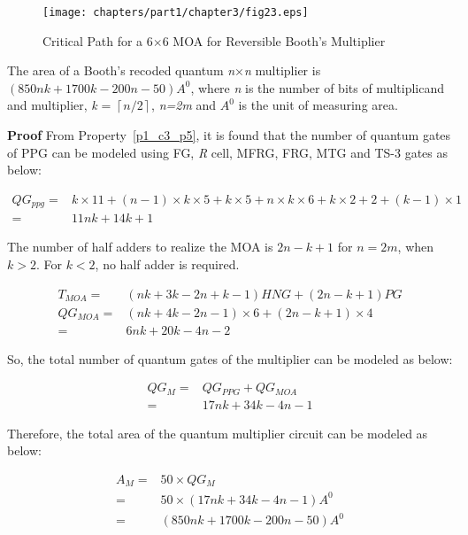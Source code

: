 \begin{figure}[H]
	\centering
	\texttt{[image: chapters/part1/chapter3/fig23.eps]}
	\caption{Critical Path for a {6$\times $6} MOA for Reversible Booth's Multiplier}
	\label{fig:p1_c3_fig23}
\end{figure}

\begin{property}\textnormal{
	The area of a Booth's recoded quantum \textit{n$\times $n }multiplier is $(850nk + 1700k - 200n - 50)A^{0}$, where \textit{n} is the number of bits of multiplicand and multiplier, \textit{k} = $\left\lceil n/2\right\rceil $, \textit{n=2m} and $A^{0}$ is the unit of measuring area.}
\end{property}

\noindent\textbf{Proof}
	From Property~\ref{p1_c3_p5}, it is found that the number of quantum gates of PPG can be modeled using FG, \textit{R} cell, MFRG, FRG, MTG and TS-3 gates as below:


\begin{align*}
QG_{ppg}=& k\times 11 + (n-1) \times k\times 5 + k\times 5 + n\times k\times 6 + k\times 2 + 2 + (k-1)\times 1\\
=& 11nk + 14k + 1
\end{align*}

\noindent The number of half adders to realize the MOA is $2n-k+1$ for $n=2m$, when $k>2$. For $k<2$, no half adder is required. 

\begin{align*}
	T_{MOA}=& (nk + 3k - 2n + k - 1)HNG + (2n - k + 1) PG\\	
QG_{MOA}=& (nk + 4k - 2n - 1)\times 6+(2n - k + 1)\times 4\\	
=& 6nk + 20k - 4n - 2
\end{align*}

\noindent So, the total number of quantum gates of the multiplier can be modeled as below:

\begin{align*}
QG_{M} =& QG_{PPG} + QG_{MOA}\\	
=& 17nk + 34k - 4n - 1
\end{align*}

\noindent Therefore, the total area of the quantum multiplier circuit can be modeled as below:

\begin{align*}
	A_{M} =&50 \times QG_{M}\\	
	=&50 \times  (17nk + 34k - 4n - 1)A^{0}\\
	=& (850nk + 1700k - 200n - 50)A^{0}
\end{align*}



